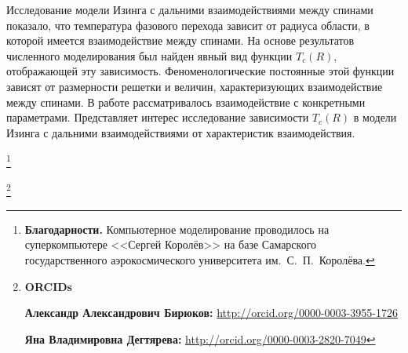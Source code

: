 \smallskip



 Исследование модели Изинга с дальними взаимодействиями между спинами показало, что температура фазового перехода зависит от радиуса области, в которой имеется взаимодействие между спинами. На основе результатов численного моделирования был найден явный вид функции $T_{c}(R)$, отображающей эту зависимость. Феноменологические постоянные этой функции зависят от размерности решетки и величин, характеризующих взаимодействие между спинами. В работе рассматривалось взаимодействие с конкретными параметрами. Представляет интерес исследование зависимости $T_{c}(R)$ в модели Изинга с дальними взаимодействиями от характеристик взаимодействия.



\thanks{\textbf{Благодарности.} Компьютерное моделирование проводилось на суперкомпьютере \linebreak <<Сергей Королёв>> на базе Самарского государственного аэрокосмического университета им.~С.~П.~Королёва.}



\thanks{{\bf ORCIDs}



{\bf Александр Александрович Бирюков:} \url{http://orcid.org/0000-0003-3955-1726}



{\bf  Яна Владимировна Дегтярева:} \url{http://orcid.org/0000-0003-2820-7049}



}






\pagebreak



\RusRef



